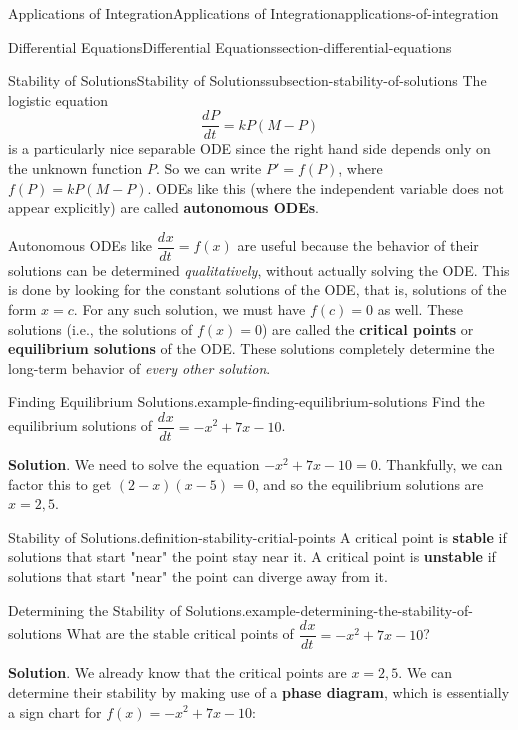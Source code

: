 \documentclass[oneside,10pt,]{book}
\newcommand{\terminology}[1]{\textbf{#1}}
\numberwithin{equation}{section}
\newcommand{\dv}[3][]{\dfrac{d^{#1} #2}{d #3^{#1}}}
\begin{document}
\begin{chapterptx}{Applications of Integration}{}{Applications of Integration}{}{}{applications-of-integration}
\begin{sectionptx}{Differential Equations}{}{Differential Equations}{}{}{section-differential-equations}
%
\begin{subsectionptx}{Stability of Solutions}{}{Stability of Solutions}{}{}{subsection-stability-of-solutions}
\hypertarget{p-752}{}%
The logistic equation%
\begin{equation*}
\dv{P}{t} = kP(M-P)
\end{equation*}
is a particularly nice separable ODE since the right hand side depends only on the unknown function \(P\). So we can write \(P' = f(P)\), where \(f(P) = kP(M-P)\). ODEs like this (where the independent variable does not appear explicitly) are called \terminology{autonomous ODEs}.%
\par
\hypertarget{p-753}{}%
Autonomous ODEs like \(\dv{x}{t} = f(x)\) are useful because the behavior of their solutions can be determined \emph{qualitatively}, without actually solving the ODE. This is done by looking for the constant solutions of the ODE, that is, solutions of the form \(x = c\). For any such solution, we must have \(f(c) = 0\) as well. These solutions (i.e., the solutions of \(f(x) = 0\)) are called the \terminology{critical points} or \terminology{equilibrium solutions} of the ODE. These solutions completely determine the long-term behavior of \emph{every other solution}.%
\begin{example}{Finding Equilibrium Solutions.}{example-finding-equilibrium-solutions}%
\hypertarget{p-754}{}%
Find the equilibrium solutions of \(\dv{x}{t} = -x^{2} + 7x - 10\).%
\par\smallskip%
\noindent\textbf{Solution}.\hypertarget{solution-158}{}\quad%
\hypertarget{p-755}{}%
We need to solve the equation \(-x^{2} + 7x - 10 = 0\). Thankfully, we can factor this to get \((2-x)(x-5) = 0\), and so the equilibrium solutions are \(x = 2,5\).%
\end{example}
\begin{definition}{Stability of Solutions.}{definition-stability-critial-points}%
\hypertarget{p-756}{}%
A critical point is \terminology{stable} if solutions that start "near" the point stay near it. A critical point is \terminology{unstable} if solutions that start "near" the point can diverge away from it.%
\end{definition}
\begin{example}{Determining the Stability of Solutions.}{example-determining-the-stability-of-solutions}%
\hypertarget{p-757}{}%
What are the stable critical points of \(\dv{x}{t} = -x^{2} + 7x - 10\)?%
\par\smallskip%
\noindent\textbf{Solution}.\hypertarget{solution-159}{}\quad%
\hypertarget{p-758}{}%
We already know that the critical points are \(x = 2, 5\). We can determine their stability by making use of a \terminology{phase diagram}, which is essentially a sign chart for \(f(x) = -x^{2} + 7x - 10\):%
\begin{figure}
\centering
{
}
\end{figure}
\end{example}
\end{subsectionptx}
\end{sectionptx}
\end{chapterptx}
\end{document}
